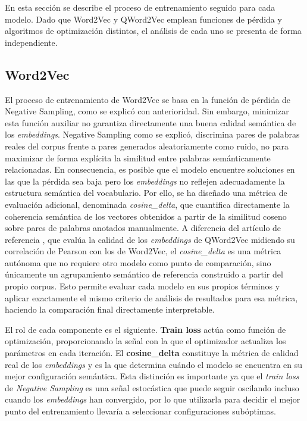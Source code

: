 En esta sección se describe el proceso de entrenamiento seguido para cada modelo. Dado que Word2Vec y QWord2Vec emplean funciones de pérdida y algoritmos de optimización distintos, el análisis de cada uno se presenta de forma independiente.

\subsection{Word2Vec}

El proceso de entrenamiento de Word2Vec se basa en la función de pérdida de Negative Sampling, como se explicó con anterioridad. Sin embargo, minimizar esta función auxiliar no garantiza directamente una buena calidad semántica de los \textit{embeddings}. Negative Sampling como se explicó, discrimina pares de palabras reales del corpus frente a pares generados aleatoriamente como ruido, no para maximizar de forma explícita la similitud entre palabras semánticamente relacionadas. En consecuencia, es posible que el modelo encuentre soluciones en las que la pérdida sea baja pero los \textit{embeddings} no reflejen adecuadamente la estructura semántica del vocabulario. Por ello, se ha diseñado una métrica de evaluación adicional, denominada \textit{cosine\_delta}, que cuantifica directamente la coherencia semántica de los vectores obtenidos a partir de la similitud coseno sobre pares de palabras anotados manualmente. A diferencia del artículo de referencia \cite{ohno_qword2vec_2025}, que evalúa la calidad de los \textit{embeddings} de QWord2Vec midiendo su correlación de Pearson con los de Word2Vec, el \textit{cosine\_delta} es una métrica autónoma que no requiere otro modelo como punto de comparación, sino únicamente un agrupamiento semántico de referencia construido a partir del propio corpus. Esto permite evaluar cada modelo en sus propios términos y aplicar exactamente el mismo criterio de análisis de resultados para esa métrica, haciendo la comparación final directamente interpretable.

El rol de cada componente es el siguiente. \textbf{Train loss} actúa como función de optimización, proporcionando la señal con la que el optimizador actualiza los parámetros en cada iteración. El \textbf{cosine\_delta} constituye la métrica de calidad real de los \textit{embeddings} y es la que determina cuándo el modelo se encuentra en su mejor configuración semántica. Esta distinción es importante ya que el \textit{train loss} de \textit{Negative Sampling} es una señal estocástica que puede seguir oscilando incluso cuando los \textit{embeddings} han convergido, por lo que utilizarla para decidir el mejor punto del entrenamiento llevaría a seleccionar configuraciones subóptimas.

